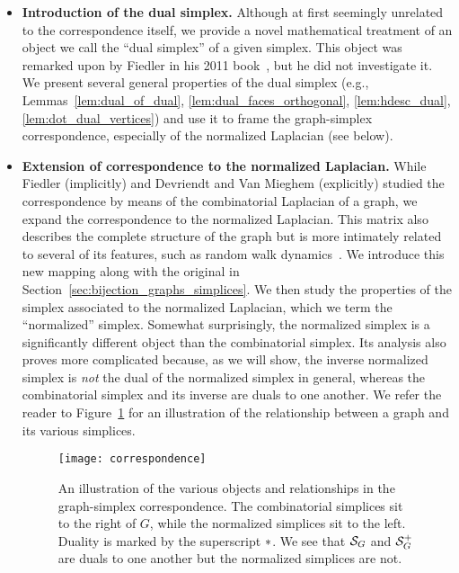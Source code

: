 \begin{itemize}
	\item {\bf Introduction of the dual simplex.} Although at first seemingly unrelated to the correspondence itself, we provide a  novel mathematical treatment of an object we call the ``dual simplex'' of a given simplex. This object was remarked upon by Fiedler in his 2011 book~\cite{fiedler2011matrices}, but he did not investigate it. We present several general properties of  the dual simplex (e.g., Lemmas~\ref{lem:dual_of_dual}, \ref{lem:dual_faces_orthogonal},  \ref{lem:hdesc_dual}, \ref{lem:dot_dual_vertices}) and use it to frame the graph-simplex correspondence, especially of the normalized Laplacian (see below). 
	\item {\bf Extension of correspondence to the normalized Laplacian.}  While Fiedler (implicitly) and Devriendt and Van Mieghem (explicitly) studied the correspondence by means of the combinatorial Laplacian of a graph, we expand the correspondence to the normalized Laplacian.  This matrix also describes the complete structure of the graph but is more intimately related to several of its features, such as random walk dynamics~\cite{chung1997spectral}. We introduce this new mapping  along with the original in Section~\ref{sec:bijection_graphs_simplices}. 
	We then study the properties of the simplex associated to the normalized Laplacian, which we term the ``normalized'' simplex.  
	Somewhat surprisingly, the normalized simplex is a significantly different object than the combinatorial  simplex. Its analysis  also proves more complicated because, as we will show, the inverse normalized simplex  is \emph{not} the dual of the normalized  simplex in general, whereas the combinatorial simplex and its inverse are duals to  one  another. 	 
	We refer  the reader to Figure~\ref{fig:correspondence} for an illustration of the relationship between a graph and its various simplices. 
	
	\begin{figure}
		\centering 
		\texttt{[image: correspondence]}
		\caption{An illustration of the various objects and relationships in the graph-simplex correspondence. The combinatorial simplices sit to the right of $G$, while the normalized simplices sit to the left. Duality  is marked by the superscript $*$. 
			We see that  $\mathcal{S}_G$ and $\mathcal{S}_G^+$ are duals to one another but the normalized simplices are not.  }
		\label{fig:correspondence}
	\end{figure}
	


\end{itemize}
